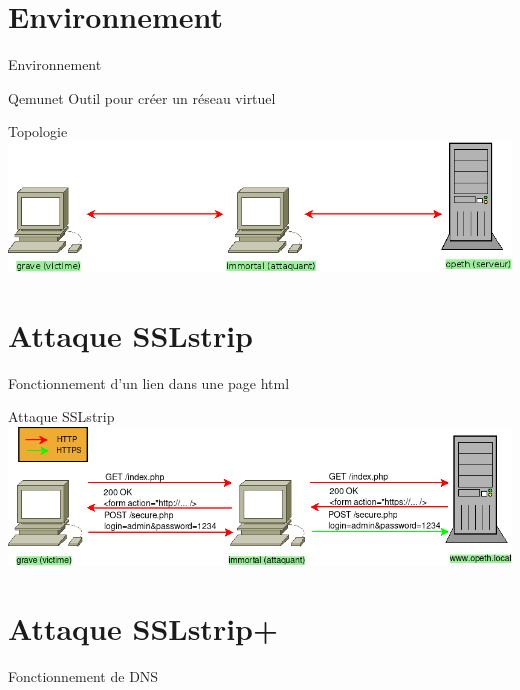 \documentclass{beamer}
\begin{document}
\section{Environnement}

\begin{frame}{Environnement}
    \begin{block}{Qemunet}
		Outil pour créer un réseau virtuel
    \end{block}
\end{frame}

\begin{frame}{Topologie}
    \includegraphics[scale=0.4]{../medias/topology.png}
\end{frame}

\section{Attaque SSLstrip}

\begin{frame}{Fonctionnement d'un lien dans une page html}

\end{frame}

\begin{frame}{Attaque SSLstrip}
    \includegraphics[scale=0.4]{../medias/sslstrip/attack.png}
\end{frame}

\section{Attaque SSLstrip+}

\begin{frame}{Fonctionnement de DNS}
\end{frame}
\end{document}
